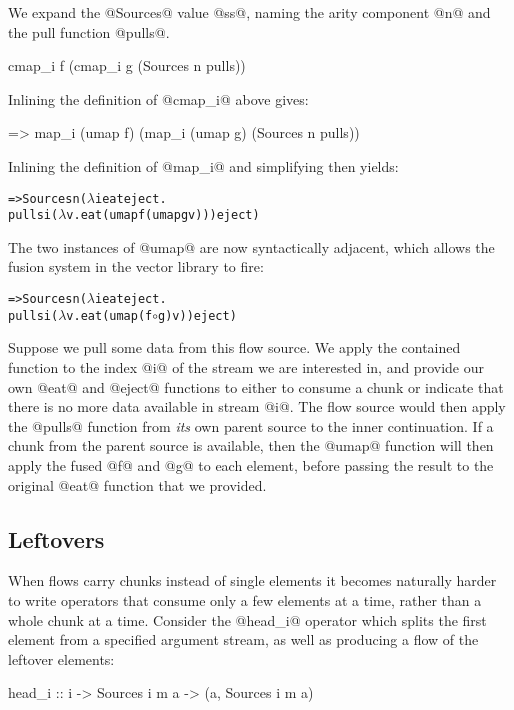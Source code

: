 We expand the @Sources@ value @ss@, naming the arity component @n@ and the pull function @pulls@.
\begin{code}
   cmap_i f (cmap_i g (Sources n pulls))
\end{code}

Inlining the definition of @cmap_i@ above gives:
\begin{code}
=> map_i (umap f) (map_i (umap g) (Sources n pulls))
\end{code}

Inlining the definition of @map_i@ and simplifying then yields:
\begin{alltt}
=> Sources n (\(\lambda\)i eat eject.
     pulls i (\(\lambda\)v. eat (umap f (umap g v))) eject)
\end{alltt}
The two instances of @umap@ are now syntactically adjacent, which allows the fusion system in the vector library to fire:

\begin{alltt}
=> Sources n (\(\lambda\)i eat eject.
     pulls i (\(\lambda\)v. eat (umap (f \(\circ\) g) v)) eject)
\end{alltt}

Suppose we pull some data from this flow source. We apply the contained function to the index @i@ of the stream we are interested in, and provide our own @eat@ and @eject@ functions to either to consume a chunk or indicate that there is no more data available in stream @i@. The flow source would then apply the @pulls@ function from \emph{its} own parent source to the inner continuation. If a chunk from the parent source is available, then the @umap@ function will then apply the fused @f@ and @g@ to each element, before passing the result to the original @eat@ function that we provided.


\subsection{Leftovers}
When flows carry chunks instead of single elements it becomes naturally harder to write operators that consume only a few elements at a time, rather than a whole chunk at a time. Consider the @head_i@ operator which splits the first element from a specified argument stream, as well as producing a flow of the leftover elements:
\begin{code}
 head_i :: i -> Sources i m a -> (a, Sources i m a)
\end{code}

